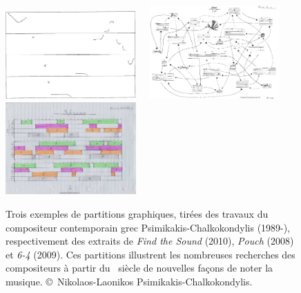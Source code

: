 \documentclass[a4paper,12pt]{article}
\begin{document}
\begin{figure}[!h]
\begin{center}
\includegraphics[width=5cm]{images/laonikos1.png}~~
\includegraphics[width=5cm]{images/laonikos2.png}~~
\includegraphics[width=5cm]{images/laonikos3.png}
\caption{\footnotesize Trois exemples de partitions graphiques, tirées des travaux du compositeur contemporain grec Psimikakis-Chalkokondylis (1989-), respectivement des extraits de \emph{Find the Sound} (2010), \emph{Pouch} (2008) et \emph{6-4} (2009). Ces partitions illustrent les nombreuses recherches des compositeurs à partir du \XXe~siècle de nouvelles façons de noter la musique. \copyright~Nikolaos-Laonikos Psimikakis-Chalkokondylis.}
\label{graphicalscore}
\end{center}
\end{figure}
\end{document}
